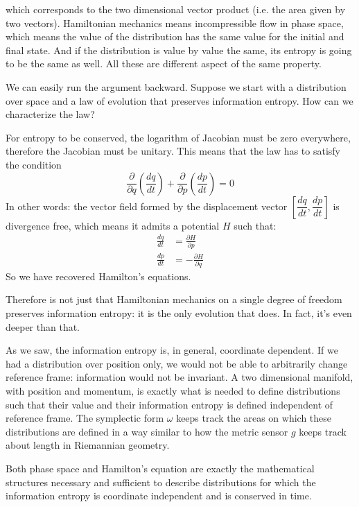 \documentclass[aps,pra,10pt,twocolumn,floatfix,nofootinbib]{revtex4-1}
\begin{document}
which corresponds to the two dimensional vector product (i.e. the area given by two vectors). Hamiltonian mechanics means incompressible flow in phase space, which means the value of the distribution has the same value for the initial and final state.  And if the distribution is value by value the same, its entropy is going to be the same as well. All these are different aspect of the same property.

We can easily run the argument backward. Suppose we start with a distribution over space and a law of evolution that preserves information entropy. How can we characterize the law?

For entropy to be conserved, the logarithm of Jacobian must be zero everywhere, therefore the Jacobian must be unitary. This means that the law has to satisfy the condition
\begin{equation}
\label{divergenceFree}
\dfrac{\partial}{\partial q} \left( \dfrac{dq}{dt} \right) + \dfrac{\partial}{\partial p} \left( \dfrac{dp}{dt} \right) = 0
\end{equation}
In other words: the vector field formed by the displacement vector $\left[ \dfrac{dq}{dt}, \dfrac{dp}{dt}\right]$ is divergence free, which means it admits a potential $H$ such that:
\begin{equation*}
\begin{aligned}
\frac{dq}{dt} &= \frac{\partial H}{\partial p}  \\
\frac{dp}{dt} &= - \frac{\partial H}{\partial q}
\end{aligned}
\end{equation*}
So we have recovered Hamilton's equations.

Therefore is not just that Hamiltonian mechanics on a single degree of freedom preserves information entropy: it is the only evolution that does. In fact, it's even deeper than that.

As we saw, the information entropy is, in general, coordinate dependent. If we had a distribution over position only, we would not be able to arbitrarily change reference frame: information would not be invariant. A two dimensional manifold, with position and momentum, is exactly what is needed to define distributions such that their value and their information entropy is defined independent of reference frame. The symplectic form $\omega$ keeps track the areas on which these distributions are defined in a way similar to how the metric sensor $g$ keeps track about length in Riemannian geometry.

Both phase space and Hamilton's equation are exactly the mathematical structures necessary and sufficient to describe distributions for which the information entropy is coordinate independent and is conserved in time.
\end{document}
